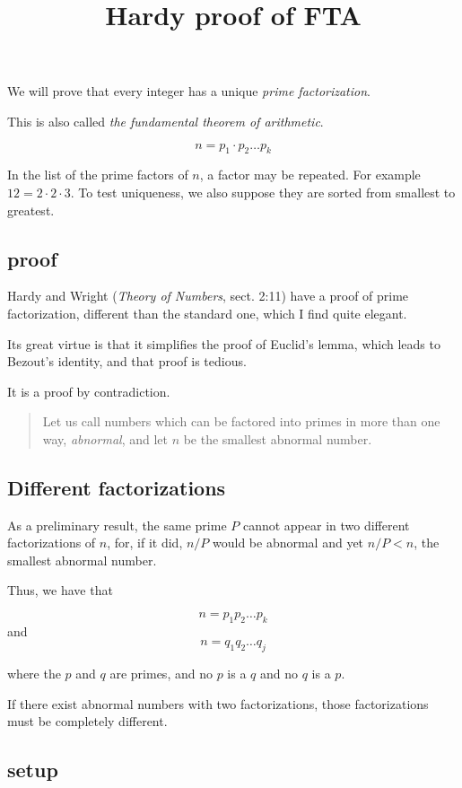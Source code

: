 \documentclass[11pt, oneside]{article}
\title{Hardy proof of FTA}
\date{}
\begin{document}
\maketitle
\Large

We will prove that every integer has a unique \emph{prime factorization}.  

This is also called \emph{the fundamental theorem of arithmetic}.

\[ n = p_1 \cdot p_2 \dots p_k \]

In the list of the prime factors of $n$, a factor may be repeated.  For example $12 = 2 \cdot 2 \cdot 3$.  To test uniqueness, we also suppose they are sorted from smallest to greatest.

\subsection*{proof}

Hardy and Wright (\emph{Theory of Numbers}, sect. 2:11) have a proof of prime factorization, different than the standard one, which I find quite elegant.

Its great virtue is that it simplifies the proof of Euclid's lemma, which leads to Bezout's identity, and that proof is tedious.

It is a proof by contradiction.

\begin{quote}Let us call numbers which can be factored into primes in more than one way, \emph{abnormal}, and let $n$ be the smallest abnormal number.\end{quote}

\subsection*{Different factorizations}

As a preliminary result, the same prime $P$ cannot appear in two different factorizations of $n$, for, if it did, $n/P$ would be abnormal and yet $n/P < n$, the smallest abnormal number.

Thus, we have that

\[ n = p_1 p_2 \dots p_k \]
and
\[ n = q_1 q_2 \dots q_j \]
    
where the $p$ and $q$ are primes, and no $p$ is a $q$ and no $q$ is a $p$.

If there exist abnormal numbers with two factorizations, those factorizations must be completely different.

\subsection*{setup}
\end{document}
